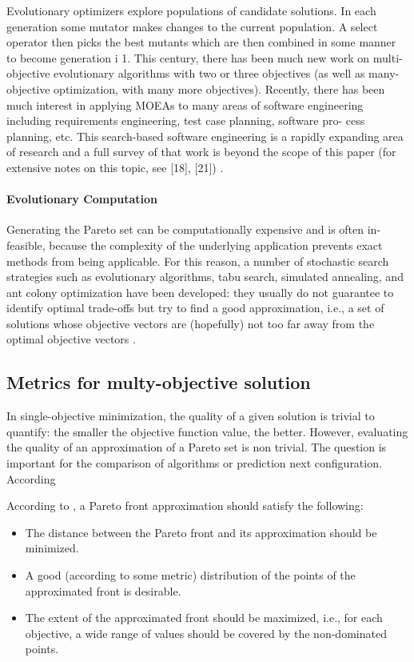             Evolutionary optimizers explore populations of candidate solutions. In each generation some mutator makes changes to the current population. 
            A select operator then picks the best mutants which are then combined in some manner to become generation i 1. 
            This century, there has been much new work on multi-objective evolutionary algorithms with two or three objectives 
            (as well as many-objective optimization, with many more objectives). Recently, there has been much interest in applying MOEAs to many areas 
            of software engineering including requirements engineering, test case planning, software pro- cess planning, etc. 
            This search-based software engineering is a rapidly expanding area of research and a full survey of that work is 
            beyond the scope of this paper (for extensive notes on this topic, see [18], [21]) \cite{MlakarPTF15}.


            \paragraph{Evolutionary Computation}

            Generating the Pareto set can be computationally expensive and is often in- feasible, because the complexity of the underlying application prevents exact methods from being applicable. For this reason, a number of stochastic search strategies such as evolutionary algorithms, tabu search, simulated annealing, and ant colony optimization have been developed: they usually do not guarantee to identify optimal trade-offs but try to find a good approximation, i.e., a set of solutions whose objective vectors are (hopefully) not too far away from the optimal objective vectors \cite{EmmerichD18}.


        \subsection{Metrics for multy-objective solution}

            In single-objective minimization, the quality of a given solution is trivial to quantify:
            the smaller the objective function value, the better. However, evaluating the quality of an approximation of a Pareto set is non trivial.
            The question is important for the comparison of algorithms or prediction next configuration. According

            According to \cite{ZitzlerDT00}, a Pareto front approximation should satisfy the following:
            \begin{itemize}
                \item The distance between the Pareto front and its approximation should be minimized.
                \item A good (according to some metric) distribution of the points of the approximated front is desirable.
                \item The extent of the approximated front should be maximized, i.e., for each objective, a wide range of values should be covered by the non-dominated points.
            \end{itemize}

